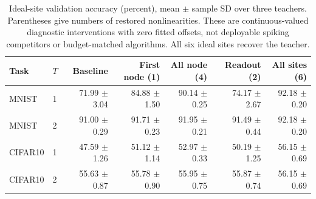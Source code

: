 \begin{table}[t]\centering\footnotesize
\begin{tabular}{llrrrrr}\toprule
Task & $T$ & Baseline & First node (1) & All node (4) & Readout (2) & All sites (6) \\ \midrule
MNIST & 1 & 71.99 $\pm$ 3.04 & 84.88 $\pm$ 1.50 & 90.14 $\pm$ 0.25 & 74.17 $\pm$ 2.67 & 92.18 $\pm$ 0.20 \\
MNIST & 2 & 91.00 $\pm$ 0.29 & 91.71 $\pm$ 0.23 & 91.95 $\pm$ 0.21 & 91.49 $\pm$ 0.44 & 92.18 $\pm$ 0.20 \\
CIFAR10 & 1 & 47.59 $\pm$ 1.26 & 51.12 $\pm$ 1.14 & 52.97 $\pm$ 0.33 & 50.19 $\pm$ 1.25 & 56.15 $\pm$ 0.69 \\
CIFAR10 & 2 & 55.63 $\pm$ 0.87 & 55.78 $\pm$ 0.90 & 55.95 $\pm$ 0.75 & 55.87 $\pm$ 0.74 & 56.15 $\pm$ 0.69 \\
\bottomrule\end{tabular}
\caption{Ideal-site validation accuracy (percent), mean $\pm$ sample SD over three teachers. Parentheses give numbers of restored nonlinearities. These are continuous-valued diagnostic interventions with zero fitted offsets, not deployable spiking competitors or budget-matched algorithms. All six ideal sites recover the teacher.}\label{tab:ideal}\end{table}
